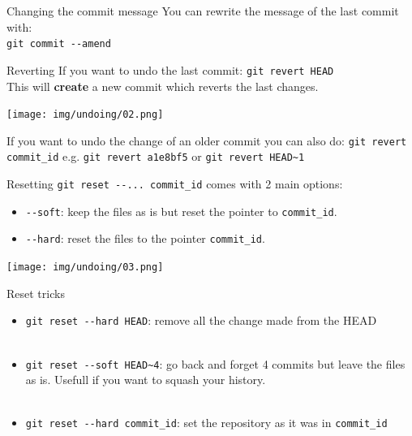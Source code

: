 \documentclass[usenames,dvipsnames,9pt]{beamer}
\begin{document}
%
\begin{frame}{Changing the commit message}
  You can rewrite the message of the last commit with:\\
  \lstinline|git commit --amend|

  \vspace{0.5cm}
\end{frame}

%
\begin{frame}{Reverting}
  If you want to undo the last commit: \lstinline|git revert HEAD|\\
  This will \textbf{create} a new commit which reverts the last changes.

  \vspace{0.5cm}
  \texttt{[image: img/undoing/02.png]}

  If you want to undo the change of an older commit you can also do:
  \lstinline|git revert commit_id| e.g. \lstinline|git revert a1e8bf5| or \lstinline|git revert HEAD~1|
\end{frame}

%
\begin{frame}{Resetting}
  \lstinline|git reset --... commit_id| comes with 2 main options:
  \begin{itemize}
    \item \lstinline|--soft|: keep the files as is but reset the pointer to \lstinline|commit_id|.
    \item \lstinline|--hard|: reset the files to the pointer \lstinline|commit_id|.
  \end{itemize}

  \vspace{0.5cm}
  \texttt{[image: img/undoing/03.png]}
\end{frame}

%
\begin{frame}{Reset tricks}
  \begin{itemize}
    \item \lstinline|git reset --hard HEAD|: remove all the change made from the HEAD\\~\\
    \item \lstinline|git reset --soft HEAD~4|: go back and forget 4 commits but leave the files as is. Usefull if you want to squash your history.\\~\\
    \item \lstinline|git reset --hard commit_id|: set the repository as it was in \lstinline|commit_id|
  \end{itemize}
\end{frame}
\end{document}
